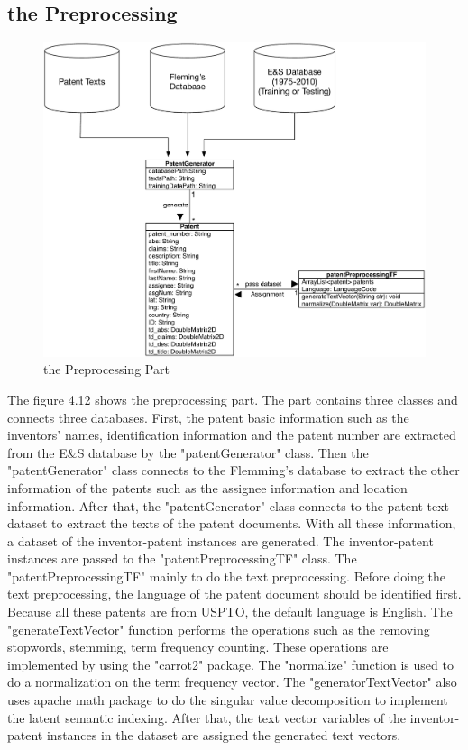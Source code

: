 \subsection{the Preprocessing}
\begin{figure}
\centering
\includegraphics[scale=0.65]{preProcessing.pdf}
\caption{the Preprocessing Part}
\end{figure}
The figure 4.12 shows the preprocessing part. The part contains three classes and connects three databases. First, the patent basic information such as the inventors' names, identification information and the patent number are extracted from the E\&S database by the "patentGenerator" class. Then the "patentGenerator" class connects to the Flemming's database to extract the other information of the patents such as the assignee information and location information. After that, the "patentGenerator" class connects to the patent text dataset to extract the texts of the patent documents. With all these information, a dataset of the inventor-patent instances are generated. The inventor-patent instances are passed to the "patentPreprocessingTF" class. The "patentPreprocessingTF" mainly to do the text preprocessing.  Before doing the text preprocessing, the language of the patent document should be identified first. Because all these patents are from USPTO, the default language is English. The "generateTextVector" function performs the operations such as the removing stopwords, stemming,  term frequency counting. These operations are implemented by using the "carrot2" package. The "normalize" function is used to do a normalization on the term frequency vector. The "generatorTextVector" also uses apache math package to do the singular value decomposition to implement the latent semantic indexing. After that, the text  vector variables of the inventor-patent instances in the dataset are assigned the generated text vectors.

